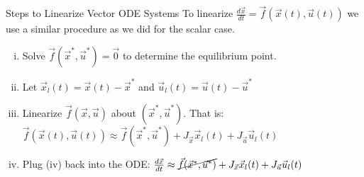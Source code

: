 \begin{frame}{Steps to Linearize Vector ODE Systems}
To linearize $\frac{d\vec{x}}{dt} = \vec{f}(\vec{x}(t), \vec{u}(t))$ we use a similar procedure as we did for the scalar case. \pause 
\begin{enumerate}[(i)]
\item Solve $\vec{f}(\vec{x}^*, \vec{u}^*) = \vec{0}$ to determine the equilibrium point. \pause \\
\item Let $\vec{x}_l(t) = \vec{x}(t) - \vec{x}^*$ and $\vec{u}_l(t) = \vec{u}(t) - \vec{u}^*$ \pause \\
\item Linearize $\vec{f}(\vec{x}, \vec{u})$ about $(\vec{x}^*, \vec{u}^*)$. That is: $\vec{f}(\vec{x}(t), \vec{u}(t)) \approx \vec{f}(\vec{x}^*, \vec{u}^*) + J_{\vec{x}}\vec{x}_l(t) + J_{\vec{u}}\vec{u}_l(t)$ \pause \\
\item Plug (iv) back into the ODE: $\frac{d\vec{x}}{dt} \approx \cancel{\vec{f}(\vec{x}^*, \vec{u}^*)} + J_{\vec{x}}\vec{x}_l(t) + J_{\vec{u}}\vec{u}_l(t)$
\end{enumerate}

\end{frame}



